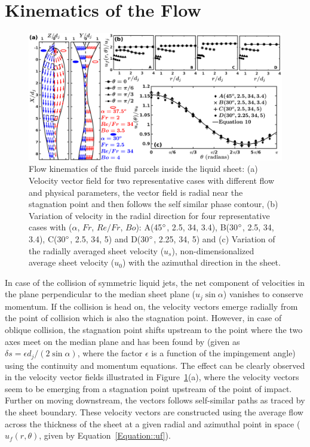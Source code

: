 \documentclass[%
aip,
sd,%
amsmath,amssymb,
preprint,%
author-year,%
]{revtex4-1}
\begin{document}
\section{Kinematics of the Flow}
\begin{figure}
	\centering
	\includegraphics[width=\linewidth]{velocityVectors}
	\caption{Flow kinematics of the fluid parcels inside the liquid sheet: (a) Velocity vector field for two representative cases with different flow and physical parameters, the vector field is radial near the stagnation point and then follows the self similar phase contour, (b) Variation of velocity in the radial direction for four representative cases with ($\alpha$, $Fr$, $Re/Fr$, $Bo$): A(45$\degree$, 2.5, 34, 3.4), B(30$\degree$, 2.5, 34, 3.4), C(30$\degree$, 2.5, 34, 5) and D(30$\degree$, 2.25, 34, 5) and (c) Variation of the radially averaged sheet velocity ($u_s$), non-dimensionalized average sheet velocity ($u_0$) with the azimuthal direction in the sheet.}
	\label{Figure::velocityVectors}
\end{figure}
In case of the collision of symmetric liquid jets, the net component of velocities in the plane perpendicular to the median sheet plane ($u_j\sin\alpha$) vanishes to conserve momentum. If the collision is head on, the velocity vectors emerge radially from the point of collision which is also the stagnation point. However, in case of oblique collision, the stagnation point shifts upstream to the point where the two axes meet on the median plane \citep{choo2007effect,yang2014liquid} and has been found by \cite{inamura2014effect} (given as $\delta s = \epsilon d_j/(2\sin\alpha)$, where the factor $\epsilon$ is a function of the impingement angle) using the continuity and momentum equations. The effect can be clearly observed in the velocity vector fields illustrated in Figure~\ref{Figure::velocityVectors}(a), where the velocity vectors seem to be emerging from a stagnation point upstream of the point of impact. Further on moving downstream, the vectors follows self-similar paths as traced by the sheet boundary. These velocity vectors are constructed using the average flow across the thickness of the sheet at a given radial and azimuthal point in space ($u_f(r,\theta)$, given by Equation~\ref{Equation::uf}). 
\end{document}
